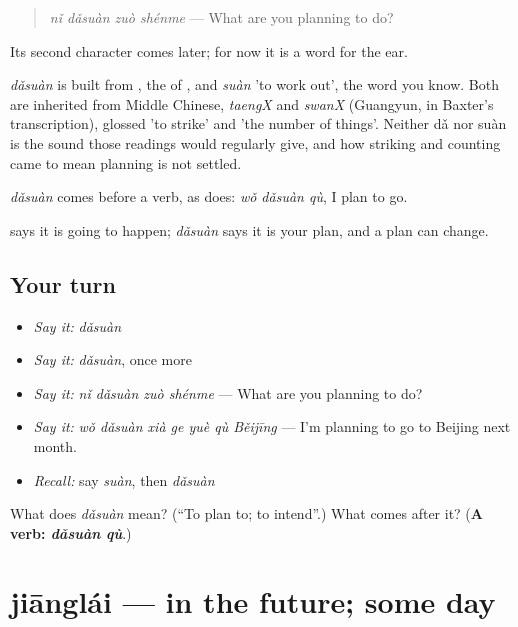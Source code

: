 \begin{quote}
\emph{nǐ dǎsuàn zuò shénme} — What are you planning to do?
\end{quote}

Its second character comes later; for now it is a word for the ear.

\begin{cousinweb}
\emph{dǎsuàn} is built from , the  of , and \emph{suàn} 'to work out', the word you know. Both are inherited from Middle Chinese, \emph{taengX} and \emph{swanX} (Guangyun, in Baxter's transcription), glossed 'to strike' and 'the number of things'. Neither dǎ nor suàn is the sound those readings would regularly give, and how striking and counting came to mean planning is not settled.
\end{cousinweb}

\begin{grammarlens}[title={What you've built}]
\emph{dǎsuàn} comes before a verb, as  does: \emph{wǒ dǎsuàn qù}, I plan to go.

 says it is going to happen; \emph{dǎsuàn} says it is your plan, and a plan can change.
\end{grammarlens}

\subsection*{Your turn}
\begin{itemize}
\raggedright
  \item \emph{Say it:} \emph{dǎsuàn}
  \item \emph{Say it:} \emph{dǎsuàn}, once more
  \item \emph{Say it:} \emph{nǐ dǎsuàn zuò shénme} — What are you planning to do?
  \item \emph{Say it:} \emph{wǒ dǎsuàn xià ge yuè qù Běijīng} — I'm planning to go to Beijing next month.
  \item \emph{Recall:} say \emph{suàn}, then \emph{dǎsuàn}
\end{itemize}

\begin{tcolorbox}[breakable,colback=teal!4,colframe=teal!35!black,title={Before you move on}]
What does \emph{dǎsuàn} mean? (\textquotedblleft{}To plan to; to intend\textquotedblright{}.) What comes after it? (\textbf{A verb: \emph{dǎsuàn qù}}.)
\end{tcolorbox}
\section[jiānglái]{jiānglái — in the future; some day}

